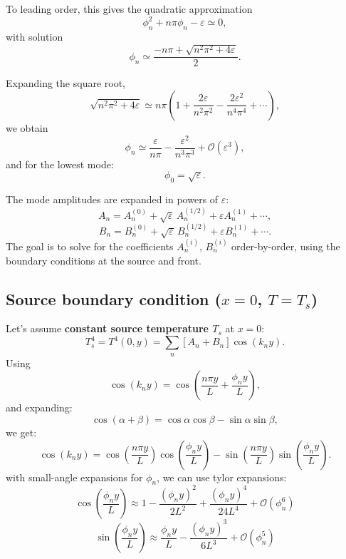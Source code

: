\documentclass{article}
\begin{document}
To leading order, this gives the quadratic approximation
\[
\phi_n^2 + n\pi \phi_n - \varepsilon \simeq 0,
\]
with solution
\begin{equation}
\phi_n \simeq \frac{-n\pi + \sqrt{n^2\pi^2 + 4\varepsilon}}{2}.
\end{equation}

Expanding the square root,
\[
\sqrt{n^2\pi^2 + 4\varepsilon}
\simeq n\pi\left(1 + \frac{2\varepsilon}{n^2\pi^2} - \frac{2\varepsilon^2}{n^4\pi^4} + \cdots \right),
\]
we obtain
\begin{equation}
\phi_n \simeq \frac{\varepsilon}{n\pi} - \frac{\varepsilon^2}{n^3\pi^3} + \mathcal{O}(\varepsilon^3),
\end{equation}
and for the lowest mode:
\begin{equation}
\phi_0 = \sqrt{\varepsilon}.
\end{equation}

The mode amplitudes are expanded in powers of $\varepsilon$:
\begin{equation}
A_n = A_n^{(0)} + \sqrt{\varepsilon}\,A_n^{(1/2)} + \varepsilon A_n^{(1)} + \cdots,
\end{equation}
\begin{equation}
B_n = B_n^{(0)} + \sqrt{\varepsilon}\,B_n^{(1/2)} + \varepsilon B_n^{(1)} + \cdots.
\end{equation}
The goal is to solve for the coefficients $A_n^{(i)}$, $B_n^{(i)}$ order-by-order, using the boundary conditions at the source and front.

\subsection*{Source boundary condition ($x=0$, $T=T_s$)}
Let's assume \textbf{constant source temperature $T_s$} at $x=0$:
\[
T_s^4 = T^4(0,y) = \sum_n \left[A_n + B_n\right] \cos(k_n y).
\]
Using
\[
\cos(k_n y) = \cos\!\left(\frac{n\pi y}{L} + \frac{\phi_n y}{L}\right),
\]
and expanding:
\[
\cos(\alpha+\beta)=\cos\alpha\cos\beta-\sin\alpha\sin\beta,
\]
we get:
\[\cos(k_n y) =
\cos\!\left(\frac{n\pi y}{L}\right)
\cos\!\left(\frac{\phi_n y}{L}\right)
-
\sin\!\left(\frac{n\pi y}{L}\right)
\sin\!\left(\frac{\phi_n y}{L}\right).
\]
with small-angle expansions for $\phi_n$, we can use tylor expansions:
\[
\cos\!\left(\frac{\phi_n y}{L}\right) \approx 1 - \frac{(\phi_n y)^2}{2L^2} + \frac{(\phi_n y)^4}{24L^4} + \mathcal{O}(\phi_n^6)
\]
\[
\sin\!\left(\frac{\phi_n y}{L}\right) \approx \frac{\phi_n y}{L} - \frac{(\phi_n y)^3}{6L^3} + \mathcal{O}(\phi_n^5)
\]
\end{document}
